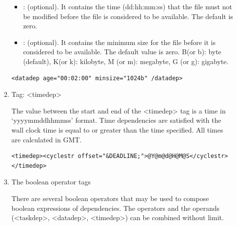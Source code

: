 \documentclass[11pt,fleqn]{report}              %
\begin{document}
\begin{enumerate}
\begin{enumerate}
\begin{itemize}
\item {: (optional). It contains the time (dd:hh:mm:ss) that the file must not be modified before the file is considered to be available. The default is zero.}

\item {:  (optional). It contains the minimum size for the file before it is considered to be available. The default value is zero. B(or b): byte (default), K(or k): kilobyte, M (or m): megabyte, G (or g): gigabyte.}

\end{itemize}

\lstset{language=XML}   
\begin{lstlisting}[frame=trBL]
   <datadep age="00:02:00" minsize="1024b" /datadep>
\end{lstlisting}

\item Tag: <timedep> 

The value between the start and end of the <timedep> tag is a time in `yyyymmddhhmmss' format. Time dependencies are satisfied with the wall clock time is equal to or greater than the time specified. All times are calculated in GMT.

\lstset{language=XML}   
\begin{lstlisting}[frame=trBL]
   <timedep><cyclestr offset="&DEADLINE;">@Y@m@d@H@M@S</cyclestr> </timedep>
\end{lstlisting}

\item The boolean operator tags

There are several boolean operators that may be used to compose boolean expressions of dependencies. The operators and the operands (<taskdep>, <datadep>, <timedep>) can be combined without limit.


\end{enumerate}
\end{enumerate}
\end{document}
